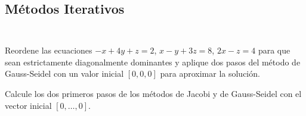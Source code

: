 \subsection{Métodos Iterativos}

\begin{listing}[ht!]
    \small
    \centering
    \inputminted[linenos]{octave}{sparsesetup.m}
\end{listing}

\begin{listing}[ht!]
    \small
    \centering
    \inputminted[linenos]{octave}{jacobi.m}
\end{listing}


\begin{questions}
    \question

    Reordene las ecuaciones $-x+4y+z=2$, $x-y+3z=8$, $2x-z=4$ para que sean estrictamente
    diagonalmente dominantes y aplique dos pasos del método de Gauss-Seidel con un valor
    inicial $[0,0,0]$ para aproximar la solución.

    \question

    Calcule los dos primeros pasos de los métodos de Jacobi y de Gauss-Seidel con el vector inicial $\left[0,\dotsc,0\right]$.

    \begin{multicols}{3}
\end{multicols}
\end{questions}
